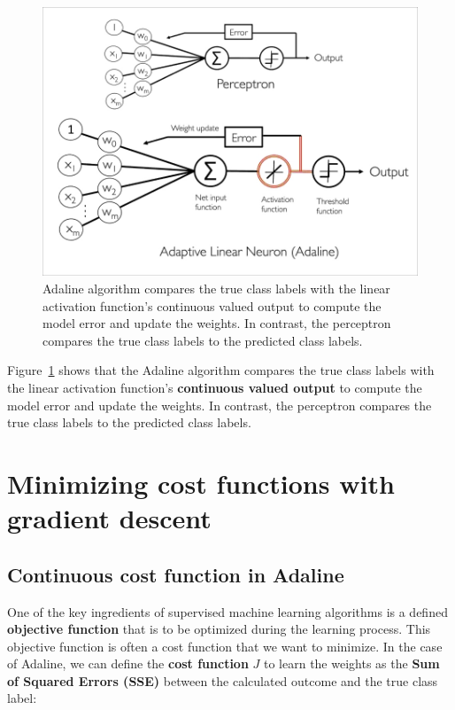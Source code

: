 \documentclass[11pt]{article}
\begin{document}
    \begin{figure}[hbt!]
        \centering
        \includegraphics[width=1\linewidth,trim=1 1 1 1,clip]{img/adaline_dag.jpg}
        \caption{Adaline algorithm compares the true class labels with the linear activation function's continuous valued output to compute the model error and update the weights.
        In contrast, the perceptron compares the true class labels to the predicted class labels.}
        \label{fig:adaline_dag}
    \end{figure}

    Figure~\ref{fig:adaline_dag} shows that the Adaline algorithm compares the true class labels with the linear activation function's \textbf{continuous valued output} to compute the model error and update the weights.
    In contrast, the perceptron compares the true class labels to the predicted class labels.

    \section{Minimizing cost functions with gradient descent} \label{sec:ada_grad_desc}

    \subsection{Continuous cost function in Adaline} \label{subsec:ada_cost}

    One of the key ingredients of supervised machine learning algorithms is a defined \textbf{objective function} that is to be optimized during the learning process.
    This objective function is often a cost function that we want to minimize.
    In the case of Adaline, we can define the \textbf{cost function} $J$ to learn the weights as the \textbf{Sum of Squared Errors (SSE)} between the calculated outcome and the true class label:
\end{document}
